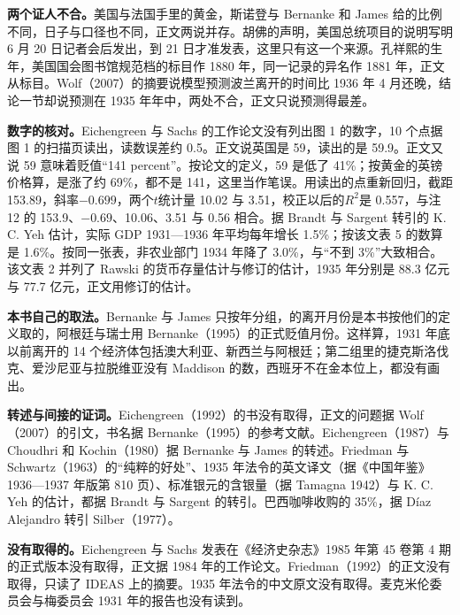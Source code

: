 \begin{deeper}[史料说明]
\textbf{两个证人不合。}美国与法国手里的黄金，斯诺登与 Bernanke 和 James 给的比例不同，日子与口径也不同，正文两说并存。胡佛的声明，美国总统项目的说明写明 6 月 20 日记者会后发出，到 21 日才准发表，这里只有这一个来源。孔祥熙的生年，美国国会图书馆规范档的标目作 1880 年，同一记录的异名作 1881 年，正文从标目。Wolf（2007）的摘要说模型预测波兰离开的时间比 1936 年 4 月还晚，结论一节却说预测在 1935 年年中，两处不合，正文只说预测得最差。

\textbf{数字的核对。}Eichengreen 与 Sachs 的工作论文没有列出图 1 的数字，10 个点据图 1 的扫描页读出，读数误差约 0.5。正文说英国是 59，读出的是 59.9。正文又说 59 意味着贬值“141 percent”。按论文的定义，59 是低了 41\%；按黄金的英镑价格算，是涨了约 69\%，都不是 141，这里当作笔误。用读出的点重新回归，截距 153.89，斜率$-0.699$，两个$t$统计量 10.02 与 3.51，校正以后的$R^{2}$是 0.557，与注 12 的 153.9、$-0.69$、10.06、3.51 与 0.56 相合。据 Brandt 与 Sargent 转引的 K. C. Yeh 估计，实际 GDP 1931—1936 年平均每年增长 1.5\%；按该文表 5 的数算是 1.6\%。按同一张表，非农业部门 1934 年降了 3.0\%，与“不到 3\%”大致相合。该文表 2 并列了 Rawski 的货币存量估计与修订的估计，1935 年分别是 88.3 亿元与 77.7 亿元，正文用修订的估计。

\textbf{本书自己的取法。}Bernanke 与 James 只按年分组，的离开月份是本书按他们的定义取的，阿根廷与瑞士用 Bernanke（1995）的正式贬值月份。这样算，1931 年底以前离开的 14 个经济体包括澳大利亚、新西兰与阿根廷；第二组里的捷克斯洛伐克、爱沙尼亚与拉脱维亚没有 Maddison 的数，西班牙不在金本位上，都没有画出。

\textbf{转述与间接的证词。}Eichengreen（1992）的书没有取得，正文的问题据 Wolf（2007）的引文，书名据 Bernanke（1995）的参考文献。Eichengreen（1987）与 Choudhri 和 Kochin（1980）据 Bernanke 与 James 的转述。Friedman 与 Schwartz（1963）的“纯粹的好处”、1935 年法令的英文译文（据《中国年鉴》1936—1937 年版第 810 页）、标准银元的含银量（据 Tamagna 1942）与 K. C. Yeh 的估计，都据 Brandt 与 Sargent 的转引。巴西咖啡收购的 35\%，据 Díaz Alejandro 转引 Silber（1977）。

\textbf{没有取得的。}Eichengreen 与 Sachs 发表在《经济史杂志》1985 年第 45 卷第 4 期的正式版本没有取得，正文据 1984 年的工作论文。Friedman（1992）的正文没有取得，只读了 IDEAS 上的摘要。1935 年法令的中文原文没有取得。麦克米伦委员会与梅委员会 1931 年的报告也没有读到。


\end{deeper}
